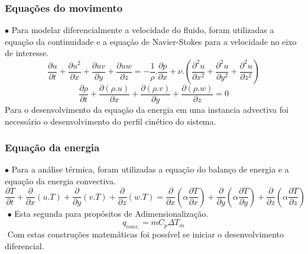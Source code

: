\documentclass[xcolor=dvipsnames,10pt,aspectratio=169]{beamer}
\begin{document}
		\begin{frame}
		\frametitle{Equações do movimento}
		$\bullet$ Para modelar diferencialmente a velocidade do fluido, foram utilizadas a equação da continuidade e a equação de Navier-Stokes para a velocidade no eixo de interesse.
		\begin{equation}
		\frac{\partial u}{\partial t} + \frac{\partial u^2}{\partial x} + \frac{\partial uv}{\partial y} + \frac{\partial uw}{\partial z} = - \frac{1}{\rho} . \frac{\partial {p}}{\partial x} + \nu . \left( \frac{\partial^2 u}{\partial x^2} + \frac{\partial^2 u}{\partial y^2} + \frac{\partial^2 u}{\partial z^2}   \right)
		\end{equation}
		\begin{equation}
		\frac{\partial \rho}{\partial t} +  \frac{\partial (\rho .u)}{\partial x} + \frac{\partial (\rho .v)}{\partial y} + \frac{\partial (\rho .w)}{\partial z} = 0
		\end{equation}
		Para o desenvolvimento da equação da energia em uma instancia advectiva foi necessário o desenvolvimento do perfil cinético do sistema.
		\end{frame}





		\begin{frame}
		\frametitle{Equação da energia}
		$\bullet$ Para a análise térmica, foram utilizadas a equação do balanço de energia e a equação da energia convectiva.
		\begin{equation}
		\frac{\partial T}{\partial t} + {\frac{\partial{}}{\partial{x}} (u.T)} + {\frac{\partial{}}{\partial{y}} (v.T)} + {\frac{\partial{}}{\partial{z}} (w.T)}
		=
		{\frac{\partial{}}{\partial{x}}} \left(\alpha {\frac{\partial{T}}{\partial{x}}} \right) +
		{\frac{\partial{}}{\partial{y}}} \left(\alpha {\frac{\partial{T}}{\partial{y}}} \right) +
		{\frac{\partial{}}{\partial{z}}} \left(\alpha {\frac{\partial{T}}{\partial{z}}} \right) 
		\end{equation}
		$ $
		$\bullet$ Esta segunda para propósitos de Adimensionalização.
		\begin{equation}\label{c_h_e}
		q_{conv.} = \dot{m} C_p \Delta T_m
		\end{equation}
		$ $
		Com estas construções matemáticas foi possível se iniciar o desenvolvimento diferencial.
		\end{frame}




		
		
\end{document}
